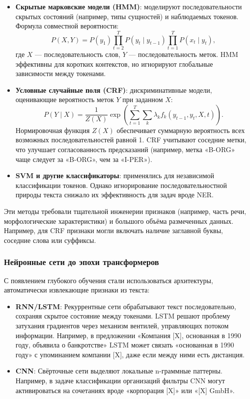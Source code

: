 \begin{itemize}
    \item \textbf{Скрытые марковские модели (HMM)}: моделируют последовательности скрытых состояний (например, типы сущностей) и наблюдаемых токенов. Формула совместной вероятности:
    \[
    P(X, Y) = P(y_1) \prod_{t=2}^{T} P(y_t \mid y_{t-1}) \prod_{t=1}^{T} P(x_t \mid y_t),
    \]
    где \(X\) — последовательность слов, \(Y\) — последовательность меток. HMM эффективны для коротких контекстов, но игнорируют глобальные зависимости между токенами.

    \item \textbf{Условные случайные поля (CRF)}: дискриминативные модели, оценивающие вероятность меток \(Y\) при заданном \(X\):
    \[
    P(Y \mid X) = \frac{1}{Z(X)} \exp\left(\sum_{t=1}^{T} \sum_{k} \lambda_k f_k(y_{t-1}, y_t, X, t)\right).
    \]
    Нормировочная функция \(Z(X)\) обеспечивает суммарную вероятность всех возможных последовательностей равной 1. CRF учитывают соседние метки, что улучшает согласованность предсказаний (например, метка «B-ORG» чаще следует за «B-ORG», чем за «I-PER»).

    \item \textbf{SVM и другие классификаторы}: применялись для независимой классификации токенов. Однако игнорирование последовательностной природы текста снижало их эффективность для задач вроде NER.
\end{itemize}

Эти методы требовали тщательной инженерии признаков (например, часть речи, морфологические характеристики) и большого объёма размеченных данных. Например, для CRF признаки могли включать наличие заглавной буквы, соседние слова или суффиксы.

\subsubsection{Нейронные сети до эпохи трансформеров}

С появлением глубокого обучения стали использоваться архитектуры, автоматически извлекающие признаки из текста:

\begin{itemize}
    \item \textbf{RNN/LSTM}: Рекуррентные сети обрабатывают текст последовательно, сохраняя скрытое состояние между токенами. LSTM решают проблему затухания градиентов через механизм вентилей, управляющих потоком информации. Например, в предложении «Компания [X], основанная в 1990 году, объявила о банкротстве» LSTM может связать «основанная в 1990 году» с упоминанием компании [X], даже если между ними есть дистанция.

    \item \textbf{CNN}: Свёрточные сети выделяют локальные n-граммные паттерны. Например, в задаче классификации организаций фильтры CNN могут активироваться на сочетаниях вроде «корпорация [X]» или «[X] GmbH».

\end{itemize}

